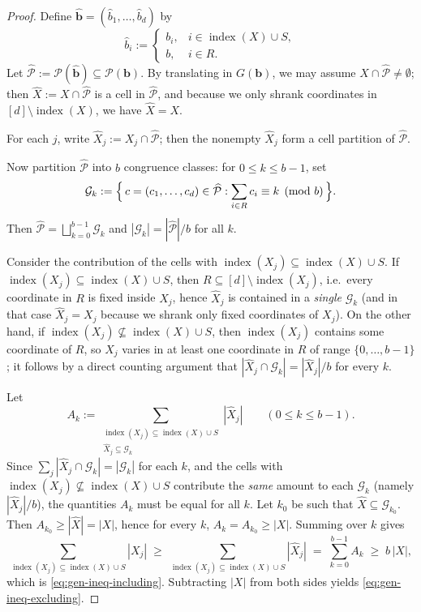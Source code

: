 \documentclass[11pt,reqno]{amsart}
\theoremstyle{definition}
\DeclareMathOperator{\ind}{index}
\begin{document}
\begin{proof}
Define \(\hat{\mathbf{b}}=(\hat b_1,\dots,\hat b_d)\) by
\[
  \hat b_i :=
  \begin{cases}
    b_i, & i\in \ind(X) \cup S,\\
    b,   & i\in R.
  \end{cases}
\]
Let \(\widehat{\mathcal{P}}:=\mathcal{P}(\hat{\mathbf{b}})\subseteq \mathcal{P}(\mathbf{b})\).
By translating in \(G(\mathbf{b})\),
we may assume \(X\cap \widehat{\mathcal{P}}\neq\emptyset\); then \(\hat X:=X\cap \widehat{\mathcal{P}}\) is a cell in \(\widehat{\mathcal{P}}\),
and because we only shrank coordinates in \([d]\setminus \ind(X)\), we have \(\hat X = X\).

For each \(j\), write \(\hat X_j:=X_j\cap \widehat{\mathcal{P}}\); then the nonempty \(\hat X_j\) form a cell partition of \(\widehat{\mathcal{P}}\).

Now partition \(\widehat{\mathcal{P}}\) into \(b\) congruence classes:
for \(0\le k\le b-1\), set
\[
  \mathcal{G}_k := \Bigl\{\,c=(c_1,\dots,c_d)\in \widehat{\mathcal{P}} : \sum_{i\in R} c_i \equiv k \pmod b\,\Bigr\}.
\]
Then \(\widehat{\mathcal{P}}=\bigsqcup_{k=0}^{b-1}\mathcal{G}_k\) and \(|\mathcal{G}_k|=|\widehat{\mathcal{P}}|/b\) for all \(k\).

Consider the contribution of the cells with \(\ind(X_j)\subseteq \ind(X) \cup S\).
If \(\ind(X_j)\subseteq \ind(X) \cup S\), then \(R\subseteq [d]\setminus \ind(X_j)\), i.e.\ every coordinate in \(R\) is fixed inside \(X_j\),
hence \(\hat X_j\) is contained in a \emph{single} \(\mathcal{G}_k\) (and in that case \(\hat X_j=X_j\) because we shrank only fixed coordinates of \(X_j\)).
On the other hand, if \(\ind(X_j)\nsubseteq \ind(X)\cup S\), then \(\ind(X_j)\) contains some coordinate of \(R\),
so \(\hat X_j\) varies in at least one coordinate in \(R\) of range \(\{0,\dots,b-1\}\); it follows by a direct counting argument that
\(|\hat X_j\cap \mathcal{G}_k|=|\hat X_j|/b\) for every \(k\).

Let
\[
  A_k := \sum_{\substack{\ind(X_j)\subseteq \ind(X)\cup S\\ \hat X_j\subseteq \mathcal{G}_k}} |\hat X_j|
  \qquad(0\le k\le b-1).
\]
Since \(\sum_j |\hat X_j\cap \mathcal{G}_k| = |\mathcal{G}_k|\) for each \(k\), and the cells with \(\ind(X_j)\nsubseteq \ind(X)\cup S\)
contribute the \emph{same} amount to each \(\mathcal{G}_k\) (namely \(|\hat X_j|/b\)), the quantities \(A_k\) must be equal for all \(k\).
Let \(k_0\) be such that \(\hat X\subseteq \mathcal{G}_{k_0}\). Then \(A_{k_0}\ge |\hat X|=|X|\), hence for every \(k\),
\(A_k=A_{k_0}\ge |X|\). Summing over \(k\) gives
\[
  \sum_{\ind(X_j)\subseteq \ind(X)\cup S} |X_j|
  \;\ge\;\sum_{\ind(X_j)\subseteq \ind(X) \cup S} |\hat X_j|
  \;=\;\sum_{k=0}^{b-1} A_k
  \;\ge\; b\,|X|,
\]
which is \eqref{eq:gen-ineq-including}. Subtracting \(|X|\) from both sides yields \eqref{eq:gen-ineq-excluding}.
\end{proof}
\end{document}
